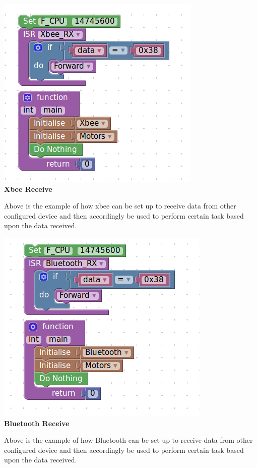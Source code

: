 \documentclass[a4paper,12pt,oneside]{book}
\begin{document}
\begin{center}
    \includegraphics[scale =0.6]{xbeerecimp}\\[.3in]
    \textbf{Xbee Receive}\\[1.3in]
    \end{center}
    \vspace{-2cm}
    Above is the example of how xbee can be set up to receive data from other configured device and then accordingly be used to perform certain task based upon the data received. 
    
\begin{center}
    \includegraphics[scale =0.6]{blerecimp}\\[.3in]
    \textbf{Bluetooth Receive}\\[1.3in]
    \end{center}
    \vspace{-2cm}
    Above is the example of how Bluetooth can be set up to receive data from other configured device and then accordingly be used to perform certain task based upon the data received.
    
\end{document}
